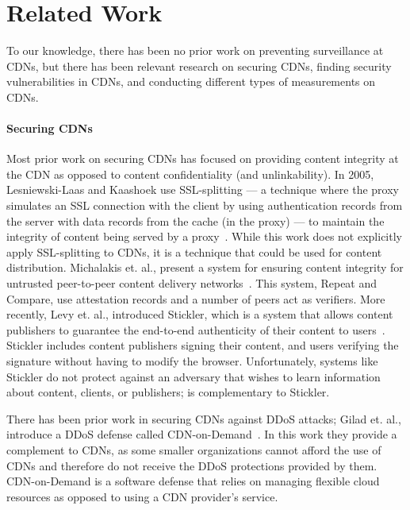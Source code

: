 \section{Related Work}
\label{sec:related}

To our knowledge, there has been no prior work on preventing surveillance at CDNs, but there 
has been relevant research on securing CDNs, finding security vulnerabilities in CDNs, and 
conducting different types of measurements on CDNs.

\paragraph{Securing CDNs} Most prior work on securing CDNs has focused on providing content 
integrity at the CDN as opposed to content confidentiality (and unlinkability).  In 2005, 
Lesniewski-Laas and Kaashoek use SSL-splitting --- a technique 
where the proxy simulates an SSL connection with the client by using authentication records from 
the server with data records from the cache (in the proxy) --- to maintain the 
integrity of content being served by a proxy~\cite{lesniewski2005ssl}.  While this work does not 
explicitly apply SSL-splitting to CDNs, it is a technique that could be used for content 
distribution.  Michalakis et. al., present a system for ensuring content integrity for untrusted 
peer-to-peer content delivery networks~\cite{michalakis2007ensuring}.  This system, Repeat and 
Compare, use attestation records and a number of peers act as verifiers.  More recently, Levy et. al., 
introduced Stickler, which is a system that allows content publishers to guarantee the end-to-end 
authenticity of their content to users~\cite{levy2015stickler}.  Stickler includes content publishers 
signing their content, and users verifying the signature without having to modify the browser.  Unfortunately, 
systems like Stickler do not protect against an adversary that wishes to learn information about content, clients, 
or publishers; \system{} is complementary to Stickler.

There has been prior work in securing CDNs against DDoS attacks; Gilad 
et. al., introduce a DDoS defense called CDN-on-Demand~\cite{gilad2016cdn}.  In this work they 
provide a complement to CDNs, as some smaller organizations cannot afford the use of CDNs and 
therefore do not receive the DDoS protections provided by them.  CDN-on-Demand is a software 
defense that relies on managing flexible cloud resources as opposed to using a CDN provider's 
service.\\

